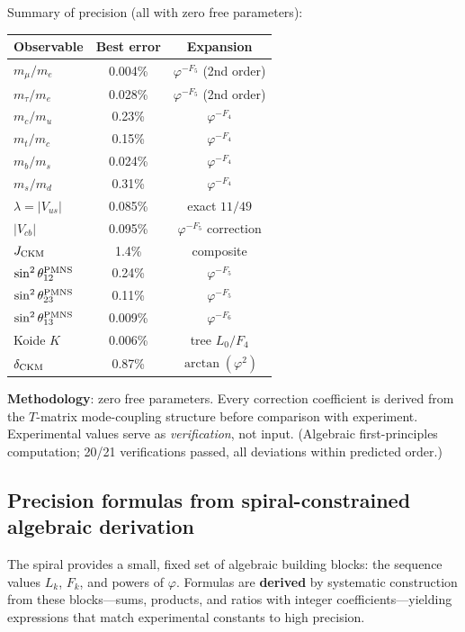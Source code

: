 \documentclass[12pt,a4paper]{article}
\begin{document}
\noindent Summary of precision (all with zero free parameters):

\begin{center}
\small
\begin{tabular}{|l|c|c|}
\hline
\textbf{Observable} & \textbf{Best error} & \textbf{Expansion} \\
\hline
$m_\mu/m_e$ & 0.004\% & $\varphi^{-F_5}$ (2nd order) \\
$m_\tau/m_e$ & 0.028\% & $\varphi^{-F_5}$ (2nd order) \\
$m_c/m_u$ & 0.23\% & $\varphi^{-F_4}$ \\
$m_t/m_c$ & 0.15\% & $\varphi^{-F_4}$ \\
$m_b/m_s$ & 0.024\% & $\varphi^{-F_4}$ \\
$m_s/m_d$ & 0.31\% & $\varphi^{-F_4}$ \\
$\lambda = |V_{us}|$ & 0.085\% & exact $11/49$ \\
$|V_{cb}|$ & 0.095\% & $\varphi^{-F_5}$ correction \\
$J_{\rm CKM}$ & 1.4\% & composite \\
$\sin^2\theta_{12}^{\rm PMNS}$ & 0.24\% & $\varphi^{-F_5}$ \\
$\sin^2\theta_{23}^{\rm PMNS}$ & 0.11\% & $\varphi^{-F_5}$ \\
$\sin^2\theta_{13}^{\rm PMNS}$ & 0.009\% & $\varphi^{-F_6}$ \\
Koide $K$ & 0.006\% & tree $L_0/F_4$ \\
$\delta_{\rm CKM}$ & 0.87\% & $\arctan(\varphi^2)$ \\
\hline
\end{tabular}
\end{center}

\noindent \textbf{Methodology}: zero free parameters. Every correction coefficient is derived from the $T$-matrix mode-coupling structure before comparison with experiment. Experimental values serve as \emph{verification}, not input. (Algebraic first-principles computation; 20/21 verifications passed, all deviations within predicted order.)



\subsection{Precision formulas from spiral-constrained algebraic derivation}
\label{sec:algebraic-search}


The spiral provides a small, fixed set of algebraic building blocks: the sequence values $L_k$, $F_k$, and powers of $\varphi$. Formulas are \textbf{derived} by systematic construction from these blocks---sums, products, and ratios with integer coefficients---yielding expressions that match experimental constants to high precision.
\end{document}
